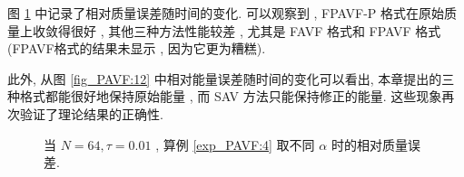 	图 \ref{fig_PAVF:11} 中记录了相对质量误差随时间的变化.
	可以观察到 , FPAVF-P 格式在原始质量上收敛得很好 , 其他三种方法性能较差 , 尤其是 FAVF 格式和 FPAVF 格式(FPAVF格式的结果未显示 , 因为它更为糟糕).

	此外, 从图 \ref{fig_PAVF:12} 中相对能量误差随时间的变化可以看出, 本章提出的三种格式都能很好地保持原始能量 , 而 SAV 方法只能保持修正的能量.
	这些现象再次验证了理论结果的正确性.

  \begin{figure}[H]
	\begin{center}
	\vspace{-1.5mm}
	\caption{当  $N = 64 , \tau=0.01$ , 算例 \ref{exp_PAVF:4} 取不同 $\alpha$ 时的相对质量误差.}
	\label{fig_PAVF:11}
	\end{center}
	\end{figure}
	
